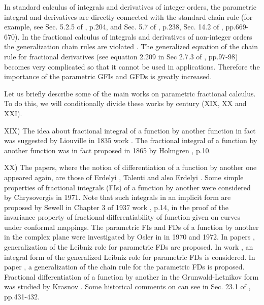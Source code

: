 \documentclass[12pt]{article}
\begin{document}
In standard calculus of integrals and derivatives of integer orders, the parametric integral and derivatives are directly connected with the standard chain rule (for example, see Sec. 5.2.5 of \cite{Zorich}, p.204, and Sec. 5.7 of \cite{ISS1979}, p.238, Sec. 14.2 of \cite{ISS1979}, pp.669-670).
In the fractional calculus of integrals and derivatives of non-integer orders the generalization chain rules are violated 
\cite{CNSNS2016,Cresson2020,Math2019}.
The generalized equation of the chain rule for fractional derivatives (see equation 2.209 in Sec 2.7.3 of \cite{Podlubny}, pp.97-98) becomes very complicated so that it cannot be used in applications.
Therefore the importance of the parametric GFIs and GFDs is greatly increased.


Let us briefly describe some of the main works on parametric fractional calculus. To do this, we will conditionally divide these works by century (XIX, XX and XXI).

XIX) The idea about fractional integral of a function by another function in fact was suggested by Liouville in 1835 work \cite{Liouville1935}. 
The fractional integral of a function by another function was in fact proposed in 1865 by Holmgren \cite{Holmgren1865}, p.10. 

XX) The papers, where the notion of differentiation of a function by another one appeared again, are those of 
Erdelyi \cite{Erdelyi1964}, 
Talenti \cite{Talenti1965} and also 
Erdelyi \cite{Erdelyi1970}. 
Some simple properties of fractional integrals (FIs) of a function by another were considered by Chrysovergis \cite{Chrysovergis1971} in 1971. 
Note that such integrals in an implicit form are proposed by Sewell in Chapter 3 of 1937 work \cite{Sewell1937}, p.14, in the proof of the invariance property of fractional differentiability of function given on curves under conformal mappings. 
The parametric FIs and FDs of a function by another in the complex plane were investigated by Osler in \cite{Osler1970a,Osler1970b,Osler1972a, Osler1972b} in 1970 and 1972. 
In papers \cite{Osler1970a,Osler1972a}, generalization of the Leibniz role for parametric FDs are proposed.
In work \cite{Osler1970a,Osler1972a}, an integral form of the generalized Leibniz role for parametric FDs is considered.
In paper \cite{Osler1970b}, a generalization of the chain rule for the parametric FDs is proposed.
Fractional differentiation of a function by another in the Grunwald-Letnikov form was studied by Krasnov \cite{Krasnov1977}. 
Some historical comments on can see in Sec. 23.1 of \cite{SKM}, pp.431-432.
\end{document}
